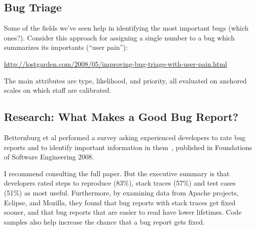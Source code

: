 \documentclass[11pt]{article}
\begin{document}
\subsection*{Bug Triage}
Some of the fields we've seen help in identifying the most
important bugs (which ones?). Consider this approach for 
assigning a single number to a bug which summarizes its
importants (``user pain''):

\begin{center}
\url{http://lostgarden.com/2008/05/improving-bug-triage-with-user-pain.html}
\end{center}

The main attributes are type, likelihood, and priority, all evaluated on anchored scales on which staff are calibrated.

\subsection*{Research: What Makes a Good Bug Report?}
Betternburg et al performed a survey asking experienced developers to
rate bug reports and to identify important information in
them~\cite{bettenburg-fse-2008}, published in Foundations of Software
Engineering 2008.

I recommend consulting the full paper. But the executive summary is
that developers rated steps to reproduce (83\%), stack traces (57\%)
and test cases (51\%) as most useful. Furthermore, by examining data
from Apache projects, Eclipse, and Mozilla, they found that bug
reports with stack traces get fixed sooner, and that bug reports that
are easier to read have lower lifetimes. Code samples also help increase
the chance that a bug report gets fixed.



\nocite{kaner:_bug_advoc}


\end{document}
